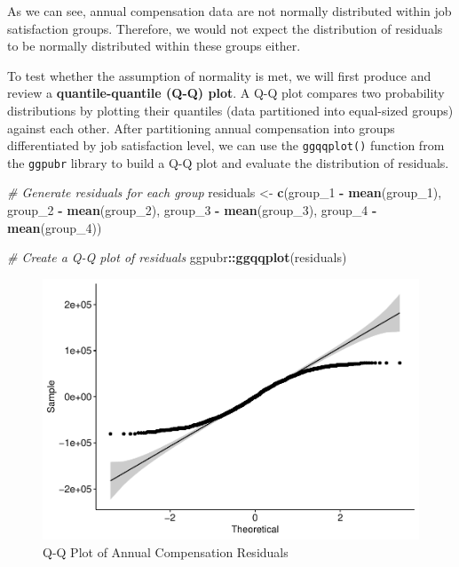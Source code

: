\documentclass[]{book}
\newenvironment{Shaded}{\begin{snugshade}}{\end{snugshade}}
\newcommand{\CommentTok}[1]{\textcolor[rgb]{0.56,0.35,0.01}{\textit{#1}}}
\newcommand{\DecValTok}[1]{\textcolor[rgb]{0.00,0.00,0.81}{#1}}
\newcommand{\KeywordTok}[1]{\textcolor[rgb]{0.13,0.29,0.53}{\textbf{#1}}}
\newcommand{\NormalTok}[1]{#1}
\newcommand{\OperatorTok}[1]{\textcolor[rgb]{0.81,0.36,0.00}{\textbf{#1}}}
\newcommand{\StringTok}[1]{\textcolor[rgb]{0.31,0.60,0.02}{#1}}
\begin{document}
As we can see, annual compensation data are not normally distributed within job satisfaction groups. Therefore, we would not expect the distribution of residuals to be normally distributed within these groups either.

To test whether the assumption of normality is met, we will first produce and review a \textbf{quantile-quantile (Q-Q) plot}. A Q-Q plot compares two probability distributions by plotting their quantiles (data partitioned into equal-sized groups) against each other. After partitioning annual compensation into groups differentiated by job satisfaction level, we can use the \texttt{ggqqplot()} function from the \texttt{ggpubr} library to build a Q-Q plot and evaluate the distribution of residuals.

\begin{Shaded}
\begin{Highlighting}[]
\CommentTok{# Generate residuals for each group}
\NormalTok{residuals <-}\StringTok{ }\KeywordTok{c}\NormalTok{(group_}\DecValTok{1} \OperatorTok{-}\StringTok{ }\KeywordTok{mean}\NormalTok{(group_}\DecValTok{1}\NormalTok{), group_}\DecValTok{2} \OperatorTok{-}\StringTok{ }\KeywordTok{mean}\NormalTok{(group_}\DecValTok{2}\NormalTok{), group_}\DecValTok{3} \OperatorTok{-}\StringTok{ }\KeywordTok{mean}\NormalTok{(group_}\DecValTok{3}\NormalTok{), group_}\DecValTok{4} \OperatorTok{-}\StringTok{ }\KeywordTok{mean}\NormalTok{(group_}\DecValTok{4}\NormalTok{))}

\CommentTok{# Create a Q-Q plot of residuals}
\NormalTok{ggpubr}\OperatorTok{::}\KeywordTok{ggqqplot}\NormalTok{(residuals)}
\end{Highlighting}
\end{Shaded}

\begin{figure}

{\centering \includegraphics{The_People_Analytics_Companion_files/figure-latex/qq-plot-1} 

}

\caption{Q-Q Plot of Annual Compensation Residuals}\label{fig:qq-plot}
\end{figure}
\end{document}
